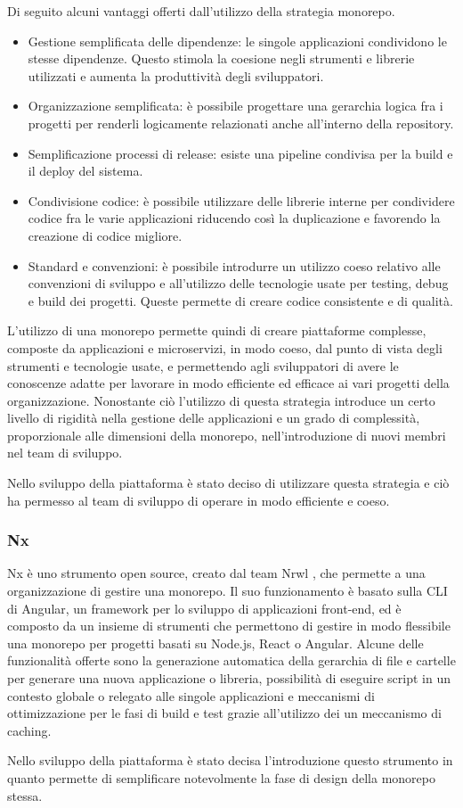 Di seguito alcuni vantaggi offerti dall'utilizzo della strategia monorepo.\cite{Monorepo}
\begin{itemize}
      \item Gestione semplificata delle dipendenze: le singole applicazioni condividono le stesse dipendenze.
            Questo stimola la coesione negli strumenti e librerie utilizzati e
            aumenta la produttività degli sviluppatori.
      \item Organizzazione semplificata: è possibile progettare una
            gerarchia logica fra i progetti per renderli logicamente
            relazionati anche all'interno della repository.
      \item Semplificazione processi di release: esiste una pipeline condivisa per la build e il deploy del sistema.
      \item Condivisione codice: è possibile utilizzare delle librerie interne per condividere codice fra le varie applicazioni riducendo
            così la duplicazione e favorendo la creazione di codice migliore.
      \item Standard e convenzioni: è possibile introdurre un utilizzo coeso relativo alle convenzioni di sviluppo e all'utilizzo delle tecnologie
            usate per testing, debug e build dei progetti. Queste permette di creare codice consistente e di qualità.

\end{itemize}
L'utilizzo di una monorepo permette quindi di creare piattaforme complesse, composte da applicazioni e microservizi, in modo
coeso, dal punto di vista degli strumenti e tecnologie usate, e permettendo agli sviluppatori di avere le conoscenze adatte per lavorare
in modo efficiente ed efficace ai vari progetti della organizzazione.
Nonostante ciò l'utilizzo di questa strategia introduce un certo livello di rigidità nella gestione delle applicazioni e un
grado di complessità, proporzionale alle dimensioni della monorepo, nell'introduzione di nuovi membri nel team di sviluppo.

Nello sviluppo della piattaforma è stato deciso di utilizzare questa strategia e ciò ha permesso
al team di sviluppo di operare in modo efficiente e coeso.

\subsubsection{Nx}
Nx \cite{Nx} è uno strumento open source, creato dal team Nrwl \cite{Nrwl}, che permette a una organizzazione
di gestire una monorepo.
Il suo funzionamento è basato sulla CLI di Angular, un framework per lo sviluppo di applicazioni front-end,
ed è composto da un insieme di strumenti che permettono di gestire in modo flessibile una monorepo per progetti basati
su Node.js, React o Angular. Alcune delle funzionalità offerte sono la generazione automatica della gerarchia di file e cartelle
per generare una nuova applicazione o libreria, possibilità di eseguire script in un contesto globale o relegato alle singole applicazioni
e meccanismi di ottimizzazione per le fasi di build e test grazie all'utilizzo dei un meccanismo di caching.

Nello sviluppo della piattaforma è stato decisa l'introduzione questo strumento in quanto permette di semplificare
notevolmente la fase di design della monorepo stessa.